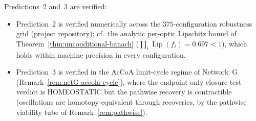 \documentclass[11pt,a4paper]{article}
\theoremstyle{plain}
\theoremstyle{definition}
\theoremstyle{remark}
\DeclareMathOperator{\Lip}{Lip}
\begin{document}
\noindent Predictions~2 and~3 are verified:

\begin{itemize}[leftmargin=*, itemsep=2pt]
\item Prediction~2 is verified numerically
across the $375$-configuration robustness grid (project repository);
cf.\ the analytic
per-optic Lipschitz bound of Theorem~\ref{thm:unconditional-banach}
($\prod_i \Lip(f_i) = 0.697 < 1$), which holds within machine
precision in every configuration.
\item Prediction~3 is verified in the AcCoA limit-cycle regime of
Network~G (Remark~\ref{rem:netG-accola-cycle}), where the
endpoint-only closure-test verdict is HOMEOSTATIC but the pathwise
recovery is contractible (oscillations are homotopy-equivalent through
recoveries, by the pathwise viability tube of Remark~\ref{rem:pathwise}).
\end{itemize}
\end{document}
